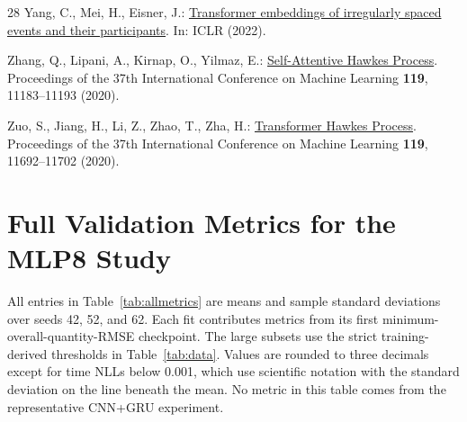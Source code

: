 \documentclass[runningheads]{llncs}
\begin{document}
\begin{thebibliography}{28}
Yang, C., Mei, H., Eisner, J.:
\href{https://www.cs.jhu.edu/~jason/papers/yang+al.iclr22.pdf}{Transformer embeddings of irregularly spaced events and their participants}. In: ICLR (2022).

Zhang, Q., Lipani, A., Kirnap, O., Yilmaz, E.: \href{https://proceedings.mlr.press/v119/zhang20q.html}{Self-Attentive Hawkes Process}. Proceedings of the 37th International Conference on Machine Learning \textbf{119}, 11183--11193 (2020).

Zuo, S., Jiang, H., Li, Z., Zhao, T., Zha, H.: \href{https://proceedings.mlr.press/v119/zuo20a.html}{Transformer Hawkes Process}. Proceedings of the 37th International Conference on Machine Learning \textbf{119}, 11692--11702 (2020).
\end{thebibliography}

\clearpage
\appendix
\renewcommand{\theHsection}{\Alph{section}}
\section{Full Validation Metrics for the MLP8 Study}
\label{app:metrics}
All entries in Table~\ref{tab:allmetrics} are means and sample standard deviations over seeds 42, 52, and 62. Each fit contributes metrics from its first minimum-overall-quantity-RMSE checkpoint. The large subsets use the strict training-derived thresholds in Table~\ref{tab:data}. Values are rounded to three decimals except for time NLLs below 0.001, which use scientific notation with the standard deviation on the line beneath the mean. No metric in this table comes from the representative CNN+GRU experiment.
\end{document}
